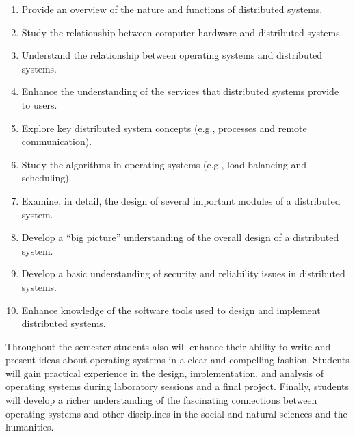 \begin{enumerate}

  \itemsep 0in

  \item Provide an overview of the nature and functions of distributed systems.

  \item Study the relationship between computer hardware and distributed systems.

  \item Understand the relationship between operating systems and distributed systems.

  \item Enhance the understanding of the services that distributed systems provide to users.

  \item Explore key distributed system concepts (e.g., processes and remote communication).

  \item Study the algorithms in operating systems (e.g., load balancing and scheduling).

  \item Examine, in detail, the design of several important modules of a distributed system.

  \item Develop a ``big picture'' understanding of the overall design of a distributed system.

  \item Develop a basic understanding of security and reliability issues in distributed systems.

  \item Enhance knowledge of the software tools used to design and implement distributed systems.

\end{enumerate}

\vspace*{-.075in}
\noindent
Throughout the semester students also will enhance their ability to write and present ideas
about operating systems in a clear and compelling fashion.  Students will gain practical experience in
the design, implementation, and analysis of operating systems during laboratory sessions and a final project. Finally,
students will develop a richer understanding of the fascinating connections between operating systems and other
disciplines in the social and natural sciences and the humanities.


